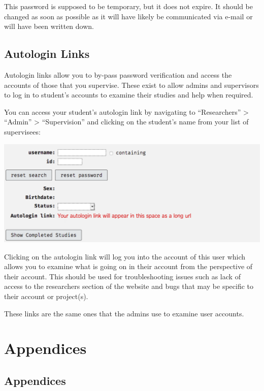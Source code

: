\documentclass[]{book}
\begin{document}
\begin{danger}
This password is supposed to be temporary, but it does not expire. It
should be changed as soon as possible as it will have likely be
communicated via e-mail or will have been written down.
\end{danger}

\section*{Autologin Links}\label{autologin-links}

Autologin links allow you to by-pass password verification and access
the accounts of those that you supervise. These exist to allow admins
and supervisors to log in to student's accounts to examine their studies
and help when required.

You can access your student's autologin link by navigating to
``Researchers'' \textgreater{} ``Admin'' \textgreater{} ``Supervision''
and clicking on the student's name from your list of supervisees:

\includegraphics{images/screenshots/autologin.png}

Clicking on the autologin link will log you into the account of this
user which allows you to examine what is going on in their account from
the perspective of their account. This should be used for
troubleshooting issues such as lack of access to the researchers section
of the website and bugs that may be specific to their account or
project(s).

These links are the same ones that the admins use to examine user
accounts.

\chapter*{Appendices}\label{appendices}

\section*{Appendices}\label{appendices-1}
\end{document}
